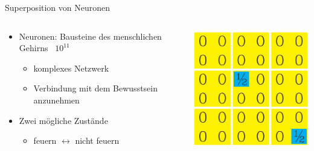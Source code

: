 \begin{frame}{Superposition von Neuronen}
\begin{columns}
		\begin{column}{0.55\textwidth}
			\begin{itemize}
				\item{Neuronen: Bausteine des menschlichen Gehirns ~$10^{11}$}
				\begin{itemize}
					\item{komplexes Netzwerk}
					\item{Verbindung mit dem Bewusstsein anzunehmen}
				\end{itemize}
				\item{Zwei mögliche Zustände}	
				\begin{itemize}
					\item{feuern $\leftrightarrow$ nicht feuern}
				\end{itemize}
			\end{itemize}
		\end{column}
		\begin{column}{0.4\textwidth}
			\centering
			\includegraphics[scale=0.35]{graphics/subsystem_example_1_4.jpg}
		\end{column}
	\end{columns}	
	
\end{frame}